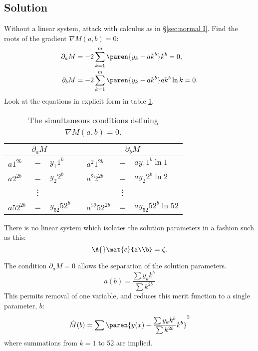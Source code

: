 \subsection{Solution}  %
Without a linear system, attack with calculus as in \S \ref{sec:normal I}. Find the roots of the gradient $\nabla M(a,b) = 0$:
  \begin{equation*}   %
    \begin{split}
      \partial_{a} M &= -2 \sum_{k=1}^{m}\paren{y_{k} - a k^{b}} k^{b} = 0, \\
      \partial_{b} M &= -2 \sum_{k=1}^{m}\paren{y_{k} - a k^{b}} a k^{b} \ln k = 0.
    \end{split}
  \end{equation*}
Look at the equations in explicit form in table \ref{tab:learn:gradient}.
\begin{table}[htbp]  %
    \caption{The simultaneous conditions defining $\nabla M(a,b) = 0$.}
    \begin{center}
        \begin{tabular}{lcl c lcl}
	        \multicolumn{3}{c}{$\partial_{a} M$} && \multicolumn{3}{c}{$\partial_{b} M$} \\\hline
            $a 1^{2b}$ &=& $y_{1} 1^{b}$ & \quad & $a^{2} 1^{2b}$ &=& $a y_{1} 1^{b} \ln 1$ \\
            $a 2^{2b}$ &=& $y_{2} 2^{b}$ & \quad & $a^{2} 2^{2b}$ &=& $a y_{2} 2^{b} \ln 2$ \\
            & \vdots & & \quad & & \vdots  \\
            $a 52^{2b}$ &=& $y_{52} 52^{b}$ & \quad & $a^{52} 52^{2b}$ &=& $a y_{52} 52^{b} \ln 52$ \\
        \end{tabular}
    \end{center}
    \label{tab:learn:gradient}
\end{table}%
There is no linear system which isolates the solution parameters in a fashion such as this:
  \begin{equation*}   %
      \A{} \mat{c}{a\\b} = \zeta.
  \end{equation*}

The condition $\partial_{a} M = 0$ allows the separation of the solution parameters.
  \begin{equation*}   %
      a(b) = \frac{\sum y_{k} k^{b}} {\sum k^{2b}}
   \label{eq:learn:a}
  \end{equation*}
This permits removal of one variable, and reduces this merit function to a single parameter, $b$:
  \begin{equation}   %
      \hat{M}(b) = \sum\paren{y(x) - \frac{\sum y_{k} k^{b}} {\sum k^{2b}} k^{b}}^{2}
   \label{eq:learn:merit 1d}
  \end{equation}
where summations from $k=1$ to 52 are implied.

